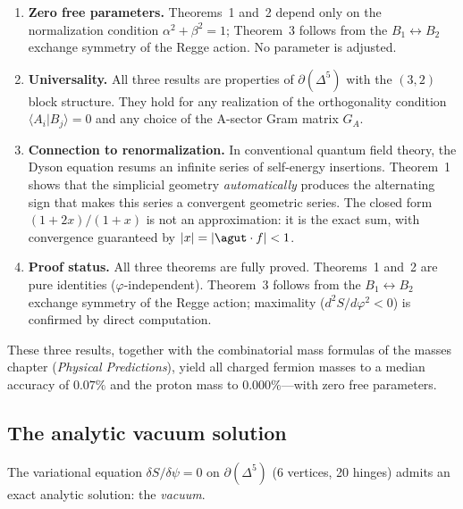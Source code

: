 \begin{enumerate}
\item \textbf{Zero free parameters.}
Theorems~1 and~2 depend only on the normalization condition
$\alpha^2 + \beta^2 = 1$; Theorem~3 follows from the $B_1 \leftrightarrow B_2$
exchange symmetry of the Regge action.  No parameter is adjusted.

\item \textbf{Universality.}
All three results are properties of $\partial(\Delta^5)$ with the
$(3,2)$ block structure.  They hold for any realization of the
orthogonality condition $\langle A_i | B_j \rangle = 0$ and any
choice of the A-sector Gram matrix $G_A$.

\item \textbf{Connection to renormalization.}
In conventional quantum field theory, the Dyson equation resums an
infinite series of self-energy insertions.  Theorem~1 shows that the
simplicial geometry \emph{automatically} produces the alternating sign
that makes this series a convergent geometric series.  The closed form
$(1+2x)/(1+x)$ is not an approximation: it is the exact sum, with
convergence guaranteed by $|x| = |\agut \cdot f| < 1$.

\item \textbf{Proof status.}
All three theorems are fully proved.  Theorems~1 and~2 are pure identities ($\varphi$-independent).  Theorem~3 follows from the $B_1 \leftrightarrow B_2$ exchange symmetry of the Regge action; maximality ($d^2S/d\varphi^2 < 0$) is confirmed by direct computation.
\end{enumerate}

These three results, together with the combinatorial mass formulas of
the masses chapter (\textit{Physical Predictions}), yield all charged fermion masses to a median
accuracy of $0.07\%$ and the proton mass to $0.000\%$---with zero
free parameters.

\subsection{The analytic vacuum solution}
\label{sec:vacuum_solution}

The variational equation $\delta S/\delta\psi = 0$ on $\partial(\Delta^5)$ (6 vertices, 20 hinges) admits an exact analytic solution: the \emph{vacuum}.

